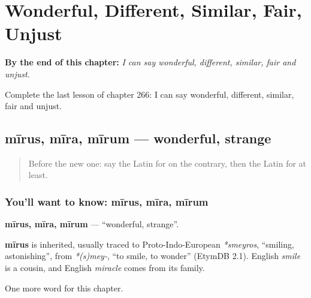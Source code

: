 
\chapter{Wonderful, Different, Similar, Fair, Unjust}
\label{ch:la-wonderful-different-similar-fair-unjust}

\begin{chapteropening}
\textbf{By the end of this chapter:} \emph{I can say wonderful, different, similar, fair and unjust.}

Complete the last lesson of chapter 266: I can say wonderful, different, similar, fair and unjust.
\end{chapteropening}

\section[mīrus, mīra, mīrum]{mīrus, mīra, mīrum — wonderful, strange}

\label{lesson:LA-C266-mirus}



\begin{quote}
Before the new one: say the Latin for on the contrary, then the Latin for at least.
\end{quote}

\subsection*{You'll want to know: mīrus, mīra, mīrum}
\textbf{mīrus, mīra, mīrum} — \textquotedblleft{}wonderful, strange\textquotedblright{}.

\begin{cousinweb}
\textbf{mīrus} is inherited, usually traced to Proto-Indo-European \emph{*smeyros}, \textquotedblleft{}smiling, astonishing\textquotedblright{}, from \emph{*(s)mey-}, \textquotedblleft{}to smile, to wonder\textquotedblright{} (EtymDB 2.1). English \emph{smile} is a cousin, and English \emph{miracle} comes from its family.
\end{cousinweb}

\begin{grammarlens}[title={What you've built}]
One more word for this chapter.
\end{grammarlens}

